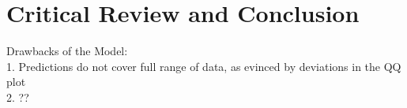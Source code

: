\section{Critical Review and Conclusion}
Drawbacks of the Model:
\\
1. Predictions do not cover full range of data, as evinced by deviations in the QQ plot
\\
2. ??